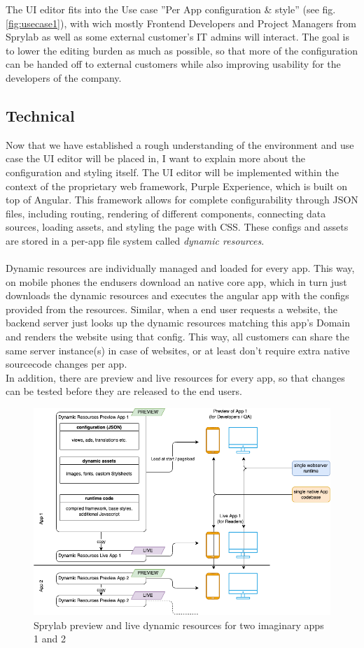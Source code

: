 The UI editor fits into the Use case ''Per App configuration \& style'' (see fig. \ref*{fig:usecase1}), with wich mostly Frontend Developers and Project Managers from Sprylab as well as some external customer's IT admins will interact. The goal is to lower the editing burden as much as possible, so that more of the configuration can be handed off to external customers while also improving usability for the developers of the company.

\subsection{Technical}
Now that we have established a rough understanding of the environment and use case the UI editor will be placed in, I want to explain more about the configuration and styling itself.
The UI editor will be implemented within the context of the proprietary web framework, Purple Experience, which is built on top of Angular.
This framework allows for complete configurability through JSON files, including routing, rendering of different components, connecting data sources, loading assets, and styling the page with CSS.
These configs and assets are stored in a per-app file system called \label{def:DynamicResources} \textit{dynamic resources}.
\\\\
Dynamic resources are individually managed and loaded for every app. This way, on mobile phones the endusers download an native core app, which in turn just downloads the dynamic resources and executes the angular app with the configs provided from the resources.
Similar, when a end user requests a website, the backend server just looks up the dynamic resources matching this app's Domain and renders the website using that config.
This way, all customers can share the same server instance(s) in case of websites, or at least don't require extra native sourcecode changes per app.
\\
In addition, there are preview and live resources for every app, so that changes can be tested before they are released to the end users.
\begin{figure}[h]
  \includegraphics[width=\linewidth]{pics/experience_resources.drawio.png}
  \caption{Sprylab preview and live dynamic resources for two imaginary apps 1 and 2}
  \label{fig:dynres}
\end{figure}
